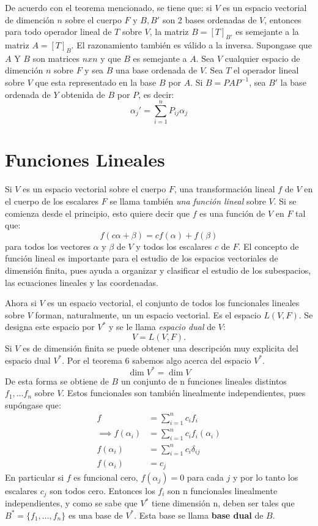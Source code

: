 \documentclass[b5paper, 11pt]{book}
\newcommand{\0}{\mathbf{0}}
\theoremstyle{estiloB}
\theoremstyle{estiloC}
\theoremstyle{estiloD}
\theoremstyle{estiloE}
\begin{document}
De acuerdo con el teorema mencionado, se tiene que: si $V$ es un espacio vectorial de dimenci\'on $n$ sobre el cuerpo $F$ y $B,B'$ son 2 bases ordenadas de $V$, entonces para todo operador lineal de $T$ sobre $V$, la matriz $B = \left[T\right]_{B'}$ es semejante a la matriz $A = \left[T\right]_{B}$. El razonamiento tambi\'en es v\'alido a la inversa. Supongase que $A$ Y $B$ son matrices $nxn$ y que $B$ es semejante a $A$. Sea $V$ cualquier espacio de dimenci\'on $n$ sobre $F$ y sea $B$ una base ordenada de $V$. Sea $T$ el operador lineal sobre $V$ que esta representado en la base $B$ por $A$. Si $B = PAP^{-1}$, sea $B'$ la base ordenada de $Y$ obtenida de $B$ por $P$, es decir: 
\[
\alpha_{j}' = \sum_{i=1}^{n}P_{ij}\alpha_{j}
\]
\section{Funciones Lineales}
Si $V$ es un espacio vectorial sobre el cuerpo $F$, una transformaci\'on lineal $f$ de $V$ en el cuerpo de los escalares $F$ se llama tambi\'en \textit{una funci\'on lineal} sobre $V$. Si se comienza desde el principio, esto quiere decir que $f$ es una funci\'on de $V$ en $F$ tal que:
\[
f(c\alpha + \beta) = cf(\alpha) + f(\beta) 
\]
para todos los vectores $\alpha$ y $\beta$ de $V$ y todos los escalares $c$ de $F$. El concepto de funci\'on lineal es importante para el estudio de los espacios vectoriales de dimensi\'on finita, pues ayuda a organizar y clasificar el estudio de los subespacios, las ecuaciones lineales y las coordenadas.

Ahora si $V$ es un espacio vectorial, el conjunto de todos los funcionales lineales sobre $V$ forman, naturalmente, un un espacio vectorial. Es el espacio $L(V,F)$. Se designa este espacio por $V^{*}$ y se le llama \textit{espacio dual} de $V$:
\[
V = L(V,F).
\]
Si $V$ es de dimensi\'on finita se puede obtener una descripci\'on muy explicita del espacio dual $V^{*}$. Por el teorema 6  sabemos algo acerca del espacio $V^{*}$.
\[
\dim V^{*} = \dim V
\]
De esta forma se obtiene de $B$ un conjunto de n funciones lineales distintos $f_{1},...f_{n}$ sobre $V$. Estos funcionales son también linealmente independientes, pues supóngase que:
\begin{align*}
f &=\sum_{i=1}^{n}c_{i}f_{i}\\
\implies f(\alpha_{i}) &= \sum_{i=1}^{n}c_{i}f_{i}(\alpha_{i})\\
f(\alpha_{i}) &= \sum_{i=1}^{n}c_{i}\delta_{ij}\\
f(\alpha_{i}) &= c_{j}
\end{align*}
En particular si $f$ es funcional cero, $f(\alpha_{j}) = 0$ para cada $j$ y por lo tanto los escalares $c_{j}$ son todos cero. Entonces los $f_{i}$ son n funcionales linealmente independientes, y como se sabe que $V^{*}$ tiene dimensi\'on n, deben ser tales que $B^{*} = \{f_{1},\ldots ,f_{n}\}$ es una base de $V^{*}$. Esta base se llama \textbf{base dual} de $B$.
\end{document}
